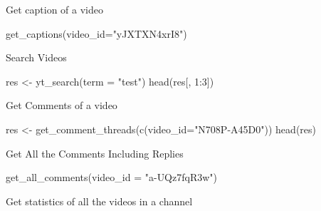 \documentclass[
]{book}
\newenvironment{Shaded}{\begin{snugshade}}{\end{snugshade}}
\newcommand{\AttributeTok}[1]{\textcolor[rgb]{0.77,0.63,0.00}{#1}}
\newcommand{\DecValTok}[1]{\textcolor[rgb]{0.00,0.00,0.81}{#1}}
\newcommand{\FunctionTok}[1]{\textcolor[rgb]{0.00,0.00,0.00}{#1}}
\newcommand{\NormalTok}[1]{#1}
\newcommand{\OtherTok}[1]{\textcolor[rgb]{0.56,0.35,0.01}{#1}}
\newcommand{\SpecialCharTok}[1]{\textcolor[rgb]{0.00,0.00,0.00}{#1}}
\newcommand{\StringTok}[1]{\textcolor[rgb]{0.31,0.60,0.02}{#1}}
\begin{document}
Get caption of a video

\begin{Shaded}
\begin{Highlighting}[]
\FunctionTok{get\_captions}\NormalTok{(}\AttributeTok{video\_id=}\StringTok{"yJXTXN4xrI8"}\NormalTok{)}
\end{Highlighting}
\end{Shaded}

Search Videos

\begin{Shaded}
\begin{Highlighting}[]
\NormalTok{res }\OtherTok{\textless{}{-}} \FunctionTok{yt\_search}\NormalTok{(}\AttributeTok{term =} \StringTok{"test"}\NormalTok{)}
\FunctionTok{head}\NormalTok{(res[, }\DecValTok{1}\SpecialCharTok{:}\DecValTok{3}\NormalTok{])}
\end{Highlighting}
\end{Shaded}

Get Comments of a video

\begin{Shaded}
\begin{Highlighting}[]
\NormalTok{res }\OtherTok{\textless{}{-}} \FunctionTok{get\_comment\_threads}\NormalTok{(}\FunctionTok{c}\NormalTok{(}\AttributeTok{video\_id=}\StringTok{"N708P{-}A45D0"}\NormalTok{))}
\FunctionTok{head}\NormalTok{(res)}
\end{Highlighting}
\end{Shaded}

Get All the Comments Including Replies

\begin{Shaded}
\begin{Highlighting}[]
\FunctionTok{get\_all\_comments}\NormalTok{(}\AttributeTok{video\_id =} \StringTok{"a{-}UQz7fqR3w"}\NormalTok{)}
\end{Highlighting}
\end{Shaded}

Get statistics of all the videos in a channel
\end{document}
